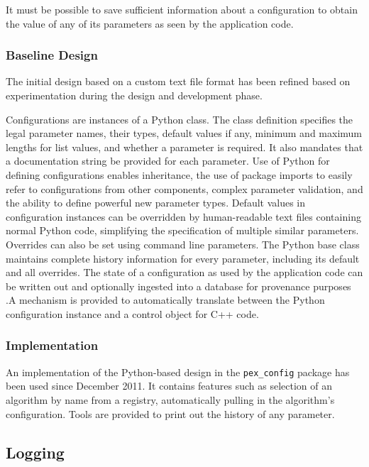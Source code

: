 \documentclass[DM,toc]{lsstdoc}
\begin{document}
It must be possible to save sufficient information about a configuration
to obtain the value of any of its parameters as seen by the application
code.

\subsubsection{Baseline Design}\label{configuration-design}

The initial design based on a custom text file format has been refined
based on experimentation during the design and development phase.

Configurations are instances of a Python class. The class definition
specifies the legal parameter names, their types, default values if any,
minimum and maximum lengths for list values, and whether a parameter is
required. It also mandates that a documentation string be provided for
each parameter. Use of Python for defining configurations enables
inheritance, the use of package imports to easily refer to
configurations from other components, complex parameter validation, and
the ability to define powerful new parameter types. Default values in
configuration instances can be overridden by human-readable text files
containing normal Python code, simplifying the specification of multiple
similar parameters. Overrides can also be set using command line
parameters. The Python base class maintains complete history information
for every parameter, including its default and all overrides. The state
of a configuration as used by the application code can be written out
and optionally ingested into a database for provenance purposes .A
mechanism is provided to automatically translate between the Python
configuration instance and a control object for C++ code.

\subsubsection{Implementation}\label{configuration-implementation}

An implementation of the Python-based design in the \texttt{pex\_config}
package has been used since December 2011. It contains features such as
selection of an algorithm by name from a registry, automatically pulling in the
algorithm's configuration. Tools are provided to print out the history of any
parameter.


\subsection{Logging}\label{logging}
\end{document}
